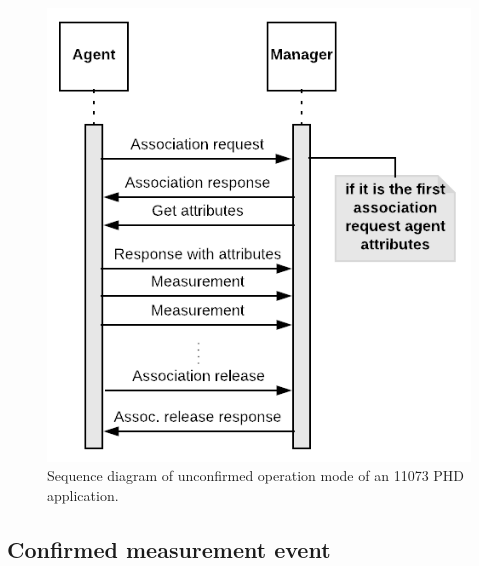 \begin{figure}[htbp]
\centerline{\includegraphics[scale=0.35]{figures/unconfirmed.png}}
\caption{Sequence diagram of unconfirmed operation mode of an 11073 PHD application.}
\label{fig:unconfirmedMode}
\end{figure}

\subsection{Confirmed measurement event}

